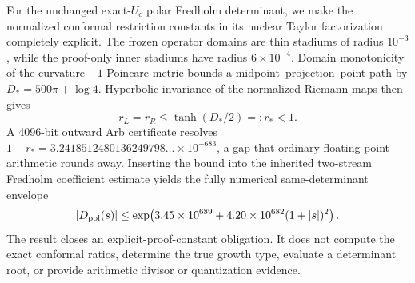 For the unchanged exact-\(U_c\) polar Fredholm determinant, we make the
normalized conformal restriction constants in its nuclear Taylor
factorization completely explicit.  The frozen operator domains are thin
stadiums of radius \(10^{-3}\), while the proof-only inner stadiums have
radius \(6\times10^{-4}\).  Domain monotonicity of the curvature-\(-1\)
Poincare metric bounds a midpoint--projection--point path by
\(D_*=500\pi+\log4\).  Hyperbolic invariance of the normalized Riemann maps
then gives
\[
 r_L=r_R\le \tanh(D_*/2)=:r_*<1.
\]
A 4096-bit outward Arb certificate resolves
\(1-r_*=3.2418512480136249798\ldots\times10^{-683}\), a gap that ordinary
floating-point arithmetic rounds away.  Inserting the bound into the
inherited two-stream Fredholm coefficient estimate yields the fully numerical
same-determinant envelope
\[
 |D_{\mathrm{pol}}(s)|\le
 \exp\!\left(3.45\times10^{689}
 +4.20\times10^{682}(1+|s|)^2\right).
\]
The result closes an explicit-proof-constant obligation.  It does not compute
the exact conformal ratios, determine the true growth type, evaluate a
determinant root, or provide arithmetic divisor or quantization evidence.

